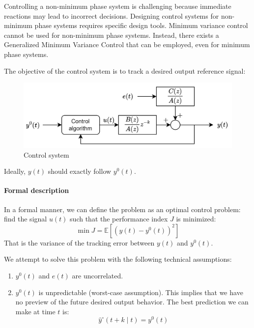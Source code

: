 Controlling a non-minimum phase system is challenging because immediate reactions may lead to incorrect decisions. 
Designing control systems for non-minimum phase systems requires specific design tools. 
Minimum variance control cannot be used for non-minimum phase systems. 
Instead, there exists a Generalized Minimum Variance Control that can be employed, even for minimum phase systems.

The objective of the control system is to track a desired output reference signal:
\begin{figure}[H]
    \centering
    \includegraphics[width=0.75\linewidth]{images/cs.png}
    \caption{Control system}
\end{figure}
Ideally, $y(t)$ should exactly follow $y^{0}(t)$. 

\paragraph*{Formal description}
In a formal manner, we can define the problem as an optimal control problem: find the signal $u(t)$ such that the performance index $J$ is minimized: 
\[\min{J}=\mathbb{E}\left[\left(y(t)-y^{0}(t)\right)^2\right]\]
That is the variance of the tracking error between $y(t)$ and $y^{0}(t)$. 

We attempt to solve this problem with the following technical assumptions:
\begin{enumerate}
    \item $y^{0}(t)$ and $e(t)$ are uncorrelated. 
    \item $y^{0}(t)$ is unpredictable (worst-case assumption). 
        This implies that we have no preview of the future desired output behavior. 
        The best prediction we can make at time $t$ is:
        \[\hat{y}^\circ(t+k\mid t)=y^{0}(t)\]
\end{enumerate}